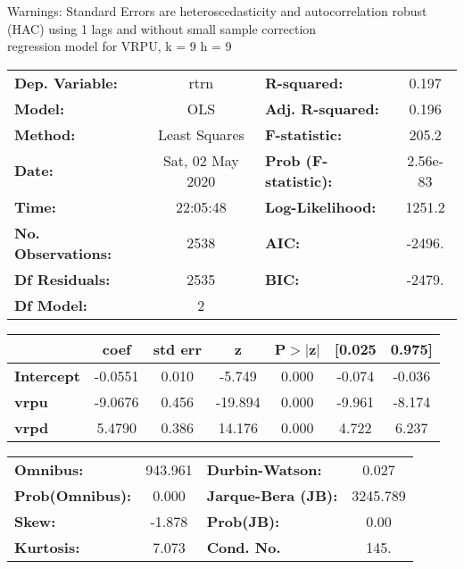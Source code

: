 Warnings: \newline
 [1] Standard Errors are heteroscedasticity and autocorrelation robust (HAC) using 1 lags and without small sample correction\\ 

regression model for VRPU, k = 9 h = 9\begin{center}
\begin{tabular}{lclc}
\toprule
\textbf{Dep. Variable:}    &       rtrn       & \textbf{  R-squared:         } &     0.197   \\
\textbf{Model:}            &       OLS        & \textbf{  Adj. R-squared:    } &     0.196   \\
\textbf{Method:}           &  Least Squares   & \textbf{  F-statistic:       } &     205.2   \\
\textbf{Date:}             & Sat, 02 May 2020 & \textbf{  Prob (F-statistic):} &  2.56e-83   \\
\textbf{Time:}             &     22:05:48     & \textbf{  Log-Likelihood:    } &    1251.2   \\
\textbf{No. Observations:} &        2538      & \textbf{  AIC:               } &    -2496.   \\
\textbf{Df Residuals:}     &        2535      & \textbf{  BIC:               } &    -2479.   \\
\textbf{Df Model:}         &           2      & \textbf{                     } &             \\
\bottomrule
\end{tabular}
\begin{tabular}{lcccccc}
                   & \textbf{coef} & \textbf{std err} & \textbf{z} & \textbf{P$> |$z$|$} & \textbf{[0.025} & \textbf{0.975]}  \\
\midrule
\textbf{Intercept} &      -0.0551  &        0.010     &    -5.749  &         0.000        &       -0.074    &       -0.036     \\
\textbf{vrpu}      &      -9.0676  &        0.456     &   -19.894  &         0.000        &       -9.961    &       -8.174     \\
\textbf{vrpd}      &       5.4790  &        0.386     &    14.176  &         0.000        &        4.722    &        6.237     \\
\bottomrule
\end{tabular}
\begin{tabular}{lclc}
\textbf{Omnibus:}       & 943.961 & \textbf{  Durbin-Watson:     } &    0.027  \\
\textbf{Prob(Omnibus):} &   0.000 & \textbf{  Jarque-Bera (JB):  } & 3245.789  \\
\textbf{Skew:}          &  -1.878 & \textbf{  Prob(JB):          } &     0.00  \\
\textbf{Kurtosis:}      &   7.073 & \textbf{  Cond. No.          } &     145.  \\
\bottomrule
\end{tabular}
\end{center}

